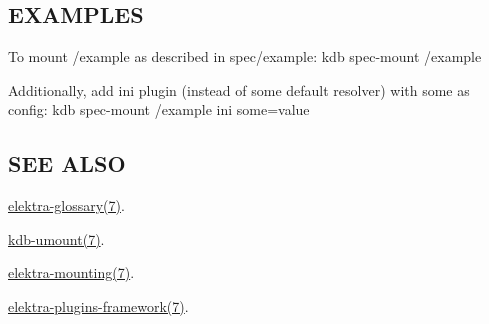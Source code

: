 \subsection*{E\+X\+A\+M\+P\+L\+E\+S}

To mount /example as described in {\ttfamily spec/example}\+: {\ttfamily kdb spec-\/mount /example}

Additionally, add {\ttfamily ini} plugin (instead of some default resolver) with {\ttfamily some} as config\+: {\ttfamily kdb spec-\/mount /example ini some=value}

\subsection*{S\+E\+E A\+L\+S\+O}


\begin{DoxyItemize}
\item \hyperlink{md_doc_help_elektra-glossary_doc_help_elektra-glossary_md}{elektra-\/glossary(7)}.
\item \hyperlink{md_doc_help_kdb-umount_doc_help_kdb-umount_md}{kdb-\/umount(7)}.
\item \hyperlink{md_doc_help_elektra-mounting_doc_help_elektra-mounting_md}{elektra-\/mounting(7)}.
\item \hyperlink{md_doc_help_elektra-plugins-framework_doc_help_elektra-plugins-framework_md}{elektra-\/plugins-\/framework(7)}. 
\end{DoxyItemize}